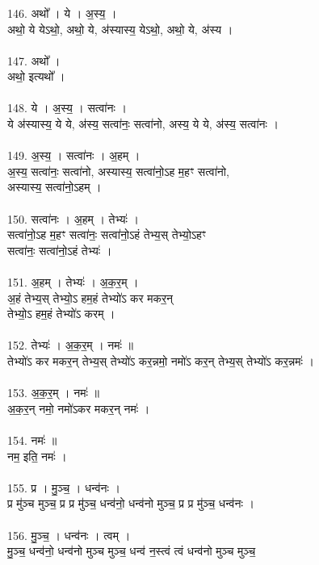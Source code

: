 \subsubsection{}
146. अथो᳚ । ये । अ॒स्य॒ ।\\
अथो॒ ये येऽथो॒, अथो॒ ये, अ॑स्यास्य॒ येऽथो॒, अथो॒ ये, अ॑स्य ।\\
\\
147. अथो᳚ ।\\
अथो॒ इत्यथो᳚ ।\\
\\
148. ये । अ॒स्य॒ । सत्वा॑नः ।\\
ये अ॑स्यास्य॒ ये ये, अ॑स्य॒ सत्वा॑नः॒ सत्वा॑नो, अस्य॒ ये ये, अ॑स्य॒ सत्वा॑नः ।\\
\\
149. अ॒स्य॒ । सत्वा॑नः । अ॒हम् ।\\
अ॒स्य॒ सत्वा॑नः॒ सत्वा॑नो, अस्यास्य॒ सत्वा॑नो॒ऽह म॒हꣳ सत्वा॑नो,\\
अस्यास्य॒ सत्वा॑नो॒ऽहम् ।\\
\\
150. सत्वा॑नः । अ॒हम् । तेभ्यः॑ ।\\
सत्वा॑नो॒ऽह म॒हꣳ सत्वा॑नः॒ सत्वा॑नो॒ऽहं तेभ्य॒स् तेभ्यो॒ऽहꣳ\\
सत्वा॑नः॒ सत्वा॑नो॒ऽहं तेभ्यः॑ ।\\
\\
151. अ॒हम् । तेभ्यः॑ । अ॒क॒र॒म् ।\\
अ॒हं तेभ्य॒स् तेभ्यो॒ऽ हम॒हं तेभ्यो॑ऽ कर मकर॒न्\\
तेभ्यो॒ऽ हम॒हं तेभ्यो॑ऽ करम् ।\\
\\
152. तेभ्यः॑ । अ॒क॒र॒म् । नमः॑ ॥\\
तेभ्यो॑ऽ कर मकर॒न् तेभ्य॒स् तेभ्यो॑ऽ कर॒न्नमो॒ नमो॑ऽ कर॒न् तेभ्य॒स् तेभ्यो॑ऽ कर॒न्नमः॑ ।\\
\\
153. अ॒क॒र॒म् । नमः॑ ॥\\
अ॒क॒र॒न् नमो॒ नमो॑ऽकर मकर॒न् नमः॑ ।\\
\\
154. नमः॑ ॥\\
नम॒ इति॒ नमः॑ ।\\
\\
155. प्र । मु॒ञ्च॒ । धन्व॑नः ।\\
प्र मु॑ञ्च मुञ्च॒ प्र प्र मु॑ञ्च॒ धन्व॑नो॒ धन्व॑नो मुञ्च॒ प्र प्र मु॑ञ्च॒ धन्व॑नः ।\\
\\
156. मु॒ञ्च॒ । धन्व॑नः । त्वम् ।\\
मु॒ञ्च॒ धन्व॑नो॒ धन्व॑नो मुञ्च मुञ्च॒ धन्व॑ न॒स्त्वं त्वं धन्व॑नो मुञ्च मुञ्च॒\\
